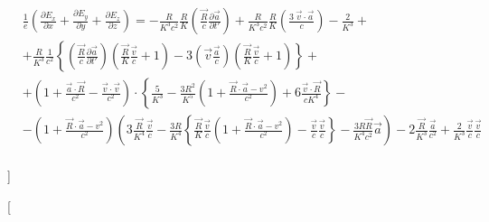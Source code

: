 \documentclass[11pt]{article}
\begin{document}
\begin{align}
  & \frac{1}{e}\left( \frac{\partial {{E}_{x}}}{\partial x}+\frac{\partial {{E}_{y}}}{\partial y}+\frac{\partial {{E}_{z}}}{\partial z} \right)=-\frac{R}{{{K}^{3}}{{c}^{2}}}\frac{R}{K}\left( \frac{\overrightarrow{R}}{c}\frac{\partial \overrightarrow{a}}{\partial t'} \right)+\frac{R}{{{K}^{3}}{{c}^{2}}}\frac{R}{K}\left( \frac{3\ \overrightarrow{v}\cdot \overrightarrow{a}}{c} \right)-\frac{2}{{{K}^{3}}}+ \\ 
 & +\frac{R}{{{K}^{3}}}\frac{1}{{{c}^{2}}}\left\{ \left( \frac{\overrightarrow{R}}{c}\frac{\partial \overrightarrow{a}}{\partial t'} \right)\left( \frac{\overrightarrow{R}}{K}\frac{\overrightarrow{v}}{c}+1 \right)-3\left( \overrightarrow{v}\frac{\overrightarrow{a}}{c} \right)\left( \frac{\overrightarrow{R}}{K}\frac{\overrightarrow{v}}{c}+1 \right) \right\}+ \\ 
 & +\left( 1+\frac{\overrightarrow{a}\cdot \overrightarrow{R}}{{{c}^{2}}}-\frac{\overrightarrow{v}\cdot \overrightarrow{v}}{{{c}^{2}}} \right)\cdot \left\{ \frac{5}{{{K}^{3}}}-\frac{3{{R}^{2}}}{{{K}^{5}}}\left( 1+\frac{\overrightarrow{R}\cdot \overrightarrow{a}-{{v}^{2}}}{{{c}^{2}}} \right)+6\frac{\overrightarrow{v}\cdot \overrightarrow{R}}{c{{K}^{4}}} \right\}- \\ 
 & -\left( 1+\frac{\overrightarrow{R}\cdot \overrightarrow{a}-{{v}^{2}}}{{{c}^{2}}} \right)\left( 3\frac{\overrightarrow{R}}{{{K}^{4}}}\frac{\overrightarrow{v}}{c}-\frac{3R}{{{K}^{4}}}\left\{ \frac{\overrightarrow{R}}{K}\frac{\overrightarrow{v}}{c}\left( 1+\frac{\overrightarrow{R}\cdot \overrightarrow{a}-{{v}^{2}}}{{{c}^{2}}} \right)-\frac{\overrightarrow{v}}{c}\frac{\overrightarrow{v}}{c} \right\}-\frac{3R\overrightarrow{R}}{{{K}^{4}}{{c}^{2}}}\overrightarrow{a} \right)-2\frac{\overrightarrow{R}}{{{K}^{3}}}\frac{\overrightarrow{a}}{{{c}^{2}}}+\frac{2}{{{K}^{3}}}\frac{\overrightarrow{v}}{c}\frac{\overrightarrow{v}}{c} \\ 
\end{align}

{]}

{[}
\end{document}
